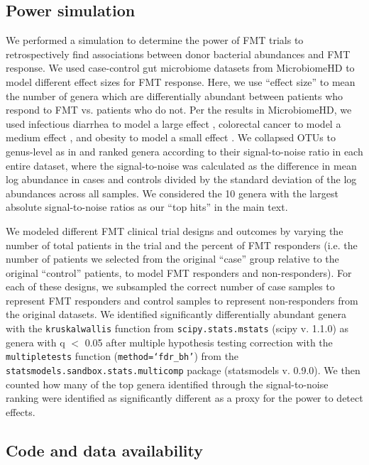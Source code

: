 \subsection{Power simulation}

We performed a simulation to determine the power of FMT trials to retrospectively find associations between donor bacterial abundances and FMT response.
We used case-control gut microbiome datasets from MicrobiomeHD \cite{Duvallet2017} to model different effect sizes for FMT response.
Here, we use ``effect size'' to mean the number of genera which are differentially abundant between patients who respond to FMT vs. patients who do not.
Per the results in MicrobiomeHD, we used infectious diarrhea to model a large effect \cite{Schubert2014}, colorectal cancer to model a medium effect \cite{Baxter2016}, and obesity to model a small effect \cite{Goodrich2014}.
We collapsed OTUs to genus-level as in \cite{Duvallet2017} and ranked genera according to their signal-to-noise ratio in each entire dataset, where the signal-to-noise was calculated as the difference in mean log abundance in cases and controls divided by the standard deviation of the log abundances across all samples.
We considered the 10 genera with the largest absolute signal-to-noise ratios as our ``top hits'' in the main text.

We modeled different FMT clinical trial designs and outcomes by varying the number of total patients in the trial and the percent of FMT responders (i.e. the number of patients we selected from the original ``case'' group relative to the original ``control'' patients, to model FMT responders and non-responders).
For each of these designs, we subsampled the correct number of case samples to represent FMT responders and control samples to represent non-responders from the original datasets.
We identified significantly differentially abundant genera with the \texttt{kruskalwallis} function from \texttt{scipy.stats.mstats} (scipy v. 1.1.0) as genera with q $<$ 0.05 after multiple hypothesis testing correction with the \texttt{multipletests} function (\texttt{method=`fdr\_bh'}) from the \texttt{statsmodels.sandbox.stats.multicomp} package (statsmodels v. 0.9.0).
We then counted how many of the top genera identified through the signal-to-noise ranking were identified as significantly different as a proxy for the power to detect effects.

\subsection{Code and data availability}


